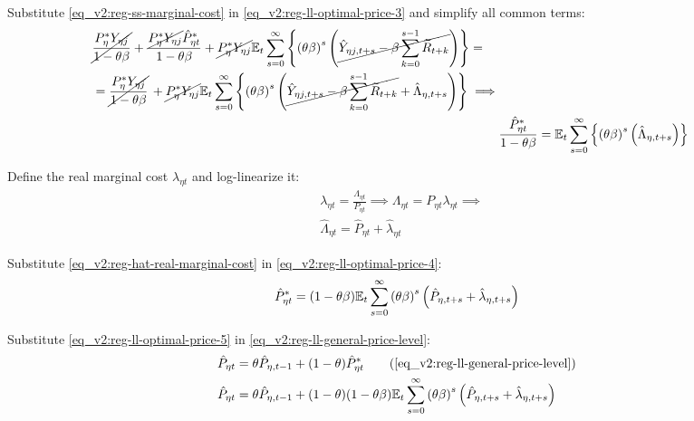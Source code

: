 \documentclass[../thesis.tex]{subfiles}
\begin{document}
Substitute \ref{eq_v2:reg-ss-marginal-cost} in \ref{eq_v2:reg-ll-optimal-price-3} and simplify all common terms:
\begin{align}
	\begin{split}
		& \cancel{\frac{P_{\eta}^{\ast} Y_{\eta j}}{1-\theta\beta}} + \frac{ \cancel{P_{\eta}^{\ast} Y_{\eta j}} \hat{P}_{\eta t}^{\ast}}{1- \theta \beta} + \cancel{P_{\eta}^{\ast} Y_{\eta j}} {\mathbb{E}_{t}} \sum_{s=0}^{\infty} \left\{ \left( \theta \beta \right)^s \left( \cancel{\hat{Y}_{\eta j, t+s} - \beta \sum_{k=0}^{s-1} \widetilde{R}_{t+k}} \right) \right\} = 
		\\
		& = \cancel{\frac{P_{\eta}^{\ast} Y_{\eta j}}{1-\theta\beta}} \, + \cancel{P_{\eta}^{\ast} Y_{\eta j}} {\mathbb{E}_{t}} \sum_{s=0}^{\infty} \left\{ \left( \theta \beta \right)^s \left( \cancel{\hat{Y}_{\eta j, t+s} - \beta \sum_{k=0}^{s-1} \widetilde{R}_{t+k}} + \hat{\Lambda}_{\eta, t+s} \right) \right\} \implies	
	\end{split} \nonumber \\
	& \frac{ \hat{P}_{\eta t}^{\ast}}{1- \theta \beta} = {\mathbb{E}_{t}} \sum_{s=0}^{\infty} \left\{ \left( \theta \beta \right)^s \left( \hat{\Lambda}_{\eta, t+s} \right) \right\} \label{eq_v2:reg-ll-optimal-price-4}
\end{align}

Define the real marginal cost $\lambda_{\eta t}$ and log-linearize it:
\begin{align}
	& \lambda_{\eta t} = \frac{\Lambda_{\eta t}}{P_{\eta t}} \implies \Lambda_{\eta t} = P_{\eta t} \lambda_{\eta t} \implies \label{eq_v2:reg-real-marginal-cost} \\
	& \hat{\Lambda}_{\eta t} = \hat{P}_{\eta t} + \hat{\lambda}_{\eta t} \label{eq_v2:reg-hat-real-marginal-cost}
\end{align}

Substitute \ref{eq_v2:reg-hat-real-marginal-cost} in \ref{eq_v2:reg-ll-optimal-price-4}:
\begin{align}
	\hat{P}_{\eta t}^{\ast} = (1- \theta \beta) {\mathbb{E}_{t}} \sum_{s=0}^{\infty} \left( \theta \beta \right)^s \left( \hat{P}_{\eta, t+s} + \hat{\lambda}_{\eta, t+s} \right) \label{eq_v2:reg-ll-optimal-price-5}
\end{align}

Substitute \ref{eq_v2:reg-ll-optimal-price-5} in \ref{eq_v2:reg-ll-general-price-level}:
\begin{align}
	\hat{P}_{\eta t} &= \theta \hat{P}_{\eta, t-1} + (1-\theta) \hat{P}_{\eta t}^{\ast} \tag{\ref{eq_v2:reg-ll-general-price-level}}\\
	\hat{P}_{\eta t} &= \theta \hat{P}_{\eta, t-1} + (1-\theta) (1- \theta \beta) \E \sum_{s=0}^{\infty} \left( \theta \beta \right)^s \left( \hat{P}_{\eta, t+s} + \hat{\lambda}_{\eta, t+s} \right) \label{eq_v2:reg-ll-general-price-level-2}
\end{align}
\end{document}
